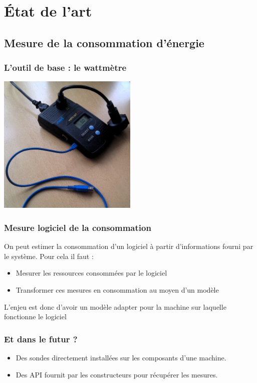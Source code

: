 \documentclass{beamer}
\begin{document}
	\section{État de l'art}
		\subsection{Mesure de la consommation d'énergie}
			\begin{frame}
				\frametitle{L'outil de base : le wattmètre}
				\begin{center}
					\includegraphics[width=0.50\textwidth]{figures/wattsup}
				\end{center}
			\end{frame}
			\begin{frame}
				\frametitle{Mesure logiciel de la consommation}
					On peut estimer la consommation d'un logiciel à partir d'informations fourni par le système. Pour cela il faut :
					\begin{itemize}
						\item Mesurer les ressources consommées par le logiciel
						\item Transformer ces mesures en consommation au moyen d'un modèle
					\end{itemize}
					L'enjeu est donc d'avoir un modèle adapter pour la machine sur laquelle fonctionne le logiciel 
			\end{frame}
			\begin{frame}
				\frametitle{Et dans le futur ?}
					\begin{itemize}
						\item Des sondes directement installées sur les composants d'une machine.
						\item Des API fournit par les constructeurs pour récupérer les mesures.
					\end{itemize}
			\end{frame}
			
\end{document}
